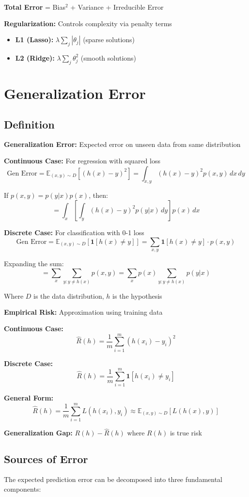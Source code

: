 \documentclass{article}
\begin{document}
\textbf{Total Error} = Bias$^2$ + Variance + Irreducible Error

\textbf{Regularization:} Controls complexity via penalty terms
\begin{itemize}
    \item \textbf{L1 (Lasso):} $\lambda \sum_j |\theta_j|$ (sparse solutions)
    \item \textbf{L2 (Ridge):} $\lambda \sum_j \theta_j^2$ (smooth solutions)
\end{itemize}

\section{Generalization Error}

\subsection{Definition}
\textbf{Generalization Error:} Expected error on unseen data from same distribution

\textbf{Continuous Case:} For regression with squared loss
\[
\text{Gen Error} = \mathbb{E}_{(x,y) \sim D}[(h(x) - y)^2] = \int_{x,y} (h(x) - y)^2 p(x,y) \, dx \, dy
\]

If $p(x,y) = p(y|x)p(x)$, then:
\[
= \int_x \left[ \int_y (h(x) - y)^2 p(y|x) \, dy \right] p(x) \, dx
\]

\textbf{Discrete Case:} For classification with 0-1 loss
\[
\text{Gen Error} = \mathbb{E}_{(x,y) \sim D}[\mathbf{1}[h(x) \neq y]] = \sum_{x,y} \mathbf{1}[h(x) \neq y] \cdot p(x,y)
\]

Expanding the sum:
\[
= \sum_x \sum_{y: y \neq h(x)} p(x,y) = \sum_x p(x) \sum_{y: y \neq h(x)} p(y|x)
\]

Where $D$ is the data distribution, $h$ is the hypothesis

\textbf{Empirical Risk:} Approximation using training data

\textbf{Continuous Case:}
\[
\hat{R}(h) = \frac{1}{m}\sum_{i=1}^{m} (h(x_i) - y_i)^2
\]

\textbf{Discrete Case:}
\[
\hat{R}(h) = \frac{1}{m}\sum_{i=1}^{m} \mathbf{1}[h(x_i) \neq y_i]
\]

\textbf{General Form:}
\[
\hat{R}(h) = \frac{1}{m}\sum_{i=1}^{m} L(h(x_i), y_i) \approx \mathbb{E}_{(x,y) \sim D}[L(h(x), y)]
\]

\textbf{Generalization Gap:} $R(h) - \hat{R}(h)$ where $R(h)$ is true risk

\subsection{Sources of Error}
The expected prediction error can be decomposed into three fundamental components:
\end{document}
